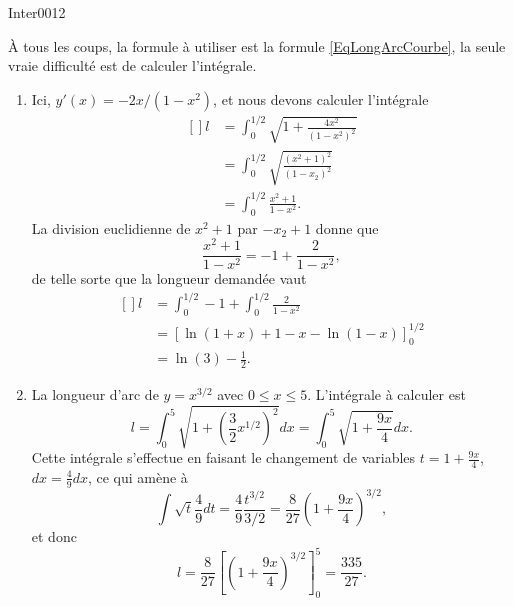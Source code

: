 \begin{corrige}{Inter0012}

À tous les coups, la formule à utiliser est la formule \eqref{EqLongArcCourbe}, la seule vraie difficulté est de calculer l'intégrale.

\begin{enumerate}

\item
Ici, $y'(x)=-2x/(1-x^2)$, et nous devons calculer l'intégrale
\begin{equation}
	\begin{aligned}[]
		l&=\int_0^{1/2}\sqrt{ 1+\frac{ 4x^2 }{ (1-x^2)^2 } }\\
			&=\int_0^{1/2}\sqrt{\frac{ (x^2+1)^2 }{ (1-x_2)^2 }}\\
			&=\int_0^{1/2}\frac{ x^2+1 }{ 1-x^2 }.
	\end{aligned}
\end{equation}
La division euclidienne de $x^2+1$ par $-x_2+1$ donne que
\begin{equation}
	\frac{ x^2+1 }{ 1-x^2 }=-1+\frac{ 2 }{ 1-x^2 },
\end{equation}
de telle sorte que la longueur demandée vaut
\begin{equation}
	\begin{aligned}[]
		l&=\int_0^{1/2}-1+\int_0^{1/2}\frac{ 2 }{ 1-x^2 }\\
			&=\left[ \ln(1+x)+1-x-\ln(1-x) \right]^{1/2}_0\\
			&=\ln(3)-\frac{ 1 }{2}.
	\end{aligned}
\end{equation}


\item
La longueur d'arc de $y=x^{3/2}$ avec $0\leq x\leq 5$. L'intégrale à calculer est
\begin{equation}
	l=\int_0^5\sqrt{1+\left( \frac{ 3 }{ 2 }x^{1/2} \right)^{2}}dx=\int_0^5\sqrt{1+\frac{ 9x }{ 4 }}dx.
\end{equation}
Cette intégrale s'effectue en faisant le changement de variables $t=1+\frac{ 9x }{ 4}$, $dx=\frac{ 4 }{ 9 }dx$, ce qui amène à
\begin{equation}
	\int\sqrt{t}\frac{ 4 }{ 9 }dt=\frac{ 4 }{ 9 }\frac{ t^{3/2} }{ 3/2 }=\frac{ 8 }{ 27 }\left( 1+\frac{ 9x }{ 4 } \right)^{3/2},
\end{equation}
et donc
\begin{equation}
	l=\frac{ 8 }{ 27 }\left[ \left( 1+\frac{ 9x }{ 4 } \right)^{3/2} \right]_0^5=\frac{ 335 }{ 27 }.
\end{equation}



\end{enumerate}

\end{corrige}
